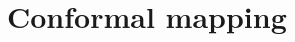 \documentclass[letter-paper]{tufte-book}
\begin{document}

\chapter{Conformal mapping}








\mainmatter




%


\end{document}
